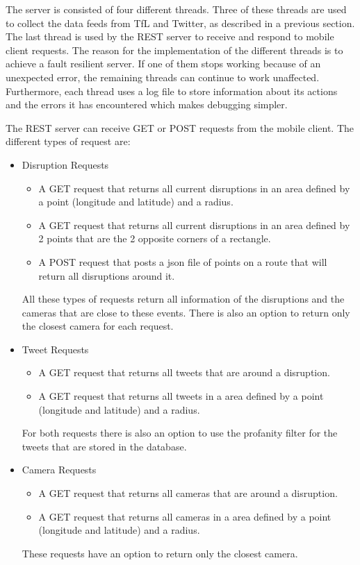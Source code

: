 The server is consisted of four different threads. Three of these threads are used to collect the data feeds from TfL and Twitter, as described in a previous section. The last thread is used by the REST server to receive and respond to mobile client requests. The reason for the implementation of the different threads is to achieve a fault resilient server. If one of them stops working because of an unexpected error, the remaining threads can continue to work unaffected. Furthermore, each thread uses a log file to store information about its actions and the errors it has encountered which makes debugging simpler.

The REST server can receive GET or POST requests from the mobile client. The different types of request are:

\begin{itemize}
\item Disruption Requests
  \begin{itemize}
  \item A GET request that returns all current disruptions in an area defined by a point (longitude and latitude) and a radius.
  \item A GET request that returns all current disruptions in an area defined by 2 points that are the 2 opposite corners of a rectangle.
  \item A POST request that posts a json file of points on a route that will return all disruptions around it.
  \end{itemize}
  All these types of requests return all information of the disruptions and the cameras that are close to these events. There is also an option to return only the closest camera for each request.
\item Tweet Requests
  \begin{itemize}
  \item A GET request that returns all tweets that are around a disruption.
  \item A GET request that returns all tweets in a area defined by a point (longitude and latitude) and a radius.
  \end{itemize}
  For both requests there is also an option to use the profanity filter for the tweets that are stored in the database.
\item Camera Requests
  \begin{itemize}
  \item A GET request that returns all cameras that are around a disruption.
  \item A GET request that returns all cameras in a area defined by a point (longitude and latitude) and a radius.
  \end{itemize}
  These requests have an option to return only the closest camera.
\end{itemize}




